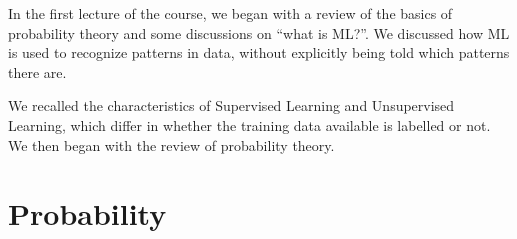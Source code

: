 \documentclass[12pt]{article}
\begin{document}
    




In the first lecture of the course, we began with a review of the basics of probability theory and some discussions on ``what is ML?''. We discussed how ML is used to recognize patterns in data, without explicitly being told which patterns there are.

We recalled the characteristics of Supervised Learning and Unsupervised Learning, which differ in whether the training data available is labelled or not. We then began with the review of probability theory.

\section{Probability}

\end{document}
